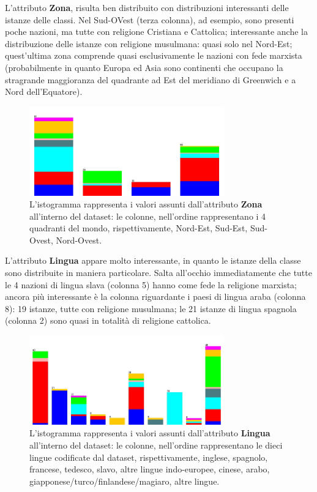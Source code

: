 \documentclass[a4paper,11pt,twoside,notitlepage,final]{scrartcl}
\begin{document}
L'attributo \textbf{Zona}, risulta ben distribuito con distribuzioni interessanti delle istanze delle classi.
Nel Sud-OVest (terza colonna), ad esempio, sono presenti poche nazioni, ma tutte con religione Cristiana e Cattolica;
interessante anche la distribuzione delle istanze con religione musulmana: quasi solo nel Nord-Est;
quest'ultima zona comprende quasi esclusivamente le nazioni con fede marxista (probabilmente in quanto Europa ed Asia sono continenti che occupano la stragrande maggioranza del quadrante ad Est del meridiano di Greenwich e a Nord dell'Equatore).

\begin{figure}[H]
  \centering
  \includegraphics[width=0.75\textwidth]{fig/religion-zone.jpg}%
  \caption{%
    L'istogramma rappresenta i valori assunti dall'attributo \textbf{Zona}
    all'interno del dataset: le colonne, nell'ordine rappresentano i 4 quadranti del mondo, rispettivamente,
    Nord-Est, Sud-Est, Sud-Ovest, Nord-Ovest.
    }%
  \label{fig:zone}
\end{figure}

L'attributo \textbf{Lingua} appare molto interessante, in quanto le istanze della classe sono distribuite in maniera particolare.
Salta all'occhio immediatamente che tutte le 4 nazioni di lingua slava (colonna 5) hanno come fede la religione marxista;
ancora più interessante è la colonna riguardante i paesi di lingua araba (colonna 8): 19 istanze, tutte con religione musulmana;
le 21 istanze di lingua spagnola (colonna 2) sono quasi in totalità di religione cattolica.

\begin{figure}[H]
  \centering
  \includegraphics[width=0.75\textwidth]{fig/religion-language.jpg}%
  \caption{%
    L'istogramma rappresenta i valori assunti dall'attributo \textbf{Lingua}
    all'interno del dataset: le colonne, nell'ordine rappresentano le dieci lingue codificate dal dataset, rispettivamente,
    inglese, spagnolo, francese, tedesco, slavo, altre lingue indo-europee, cinese, arabo, giapponese/turco/finlandese/magiaro, altre lingue.
    }%
  \label{fig:language}
\end{figure}
\end{document}
